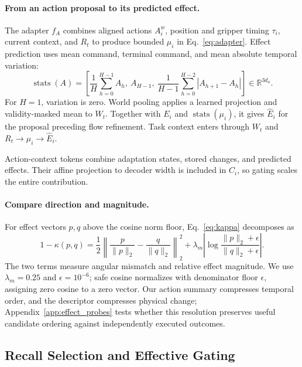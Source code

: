 \paragraph{From an action proposal to its predicted effect.}
The adapter $f_A$ combines aligned actions $A_i^w$, position and gripper timing $\tau_i$, current context, and $R_t$ to produce bounded $\mu_i$ in Eq.~\eqref{eq:adapter}.
Effect prediction uses mean command, terminal command, and mean absolute temporal variation:
\begin{equation}
 \operatorname{stats}(A)=\left[
 \frac1H\sum_{h=0}^{H-1}A_h,\ A_{H-1},\
 \frac1{H-1}\sum_{h=0}^{H-2}|A_{h+1}-A_h|
 \right]\in\mathbb R^{3d_a}.
 \label{eq:action_stats}
\end{equation}
For $H=1$, variation is zero.
World pooling applies a learned projection and validity-masked mean to $W_t$.
Together with $E_i$ and $\operatorname{stats}(\mu_i)$, it gives $\widehat E_i$ for the proposal preceding flow refinement.
Task context enters through $W_t$ and $R_t\rightarrow\mu_i\rightarrow\widehat E_i$.

Action-context tokens combine adaptation states, stored changes, and predicted effects.
Their affine projection to decoder width is included in $C_i$, so gating scales the entire contribution.


\paragraph{Compare direction and magnitude.}
For effect vectors $p,q$ above the cosine norm floor, Eq.~\eqref{eq:kappa} decomposes as
\begin{equation}
 1-\kappa(p,q)=\frac12\left\|\frac p{\|p\|_2}-\frac q{\|q\|_2}\right\|_2^2
 +\lambda_m\left|\log\frac{\|p\|_2+\epsilon}{\|q\|_2+\epsilon}\right|.
 \label{eq:comparison_geometry}
\end{equation}
The two terms measure angular mismatch and relative effect magnitude.
We use $\lambda_m=0.25$ and $\epsilon=10^{-6}$; safe cosine normalizes with denominator floor $\epsilon$, assigning zero cosine to a zero vector.
Our action summary compresses temporal order, and the descriptor compresses physical change; Appendix~\ref{app:effect_probes} tests whether this resolution preserves useful candidate ordering against independently executed outcomes.

\subsection{Recall Selection and Effective Gating}
\label{app:gate_details}

